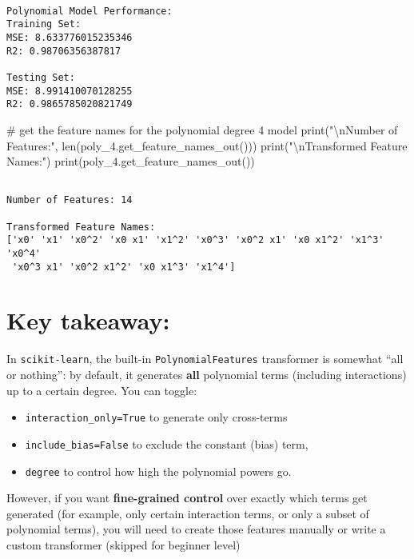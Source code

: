 \documentclass[
  letterpaper,
  DIV=11,
  numbers=noendperiod]{scrreprt}
\newenvironment{Shaded}{\begin{snugshade}}{\end{snugshade}}
\newcommand{\BuiltInTok}[1]{\textcolor[rgb]{0.00,0.23,0.31}{#1}}
\newcommand{\CharTok}[1]{\textcolor[rgb]{0.13,0.47,0.30}{#1}}
\newcommand{\CommentTok}[1]{\textcolor[rgb]{0.37,0.37,0.37}{#1}}
\newcommand{\NormalTok}[1]{\textcolor[rgb]{0.00,0.23,0.31}{#1}}
\newcommand{\StringTok}[1]{\textcolor[rgb]{0.13,0.47,0.30}{#1}}
\providecommand{\tightlist}{%
  \setlength{\itemsep}{0pt}\setlength{\parskip}{0pt}}\usepackage{longtable,booktabs,array}
\begin{document}
\begin{verbatim}

Polynomial Model Performance:
Training Set:
MSE: 8.633776015235346
R2: 0.98706356387817

Testing Set:
MSE: 8.991410070128255
R2: 0.9865785020821749
\end{verbatim}

\begin{Shaded}
\begin{Highlighting}[]
\CommentTok{\# get the feature names for the polynomial degree 4 model}
\BuiltInTok{print}\NormalTok{(}\StringTok{"}\CharTok{\textbackslash{}n}\StringTok{Number of Features:"}\NormalTok{, }\BuiltInTok{len}\NormalTok{(poly\_4.get\_feature\_names\_out()))}
\BuiltInTok{print}\NormalTok{(}\StringTok{"}\CharTok{\textbackslash{}n}\StringTok{Transformed Feature Names:"}\NormalTok{)}
\BuiltInTok{print}\NormalTok{(poly\_4.get\_feature\_names\_out())}
\end{Highlighting}
\end{Shaded}

\begin{verbatim}

Number of Features: 14

Transformed Feature Names:
['x0' 'x1' 'x0^2' 'x0 x1' 'x1^2' 'x0^3' 'x0^2 x1' 'x0 x1^2' 'x1^3' 'x0^4'
 'x0^3 x1' 'x0^2 x1^2' 'x0 x1^3' 'x1^4']
\end{verbatim}

\section{Key takeaway:}\label{key-takeaway}

In \texttt{scikit-learn}, the built-in \texttt{PolynomialFeatures}
transformer is somewhat ``all or nothing'': by default, it generates
\textbf{all} polynomial terms (including interactions) up to a certain
degree. You can toggle:

\begin{itemize}
\tightlist
\item
  \texttt{interaction\_only=True} to generate only cross-terms
\item
  \texttt{include\_bias=False} to exclude the constant (bias) term,
\item
  \texttt{degree} to control how high the polynomial powers go.
\end{itemize}

However, if you want \textbf{fine-grained control} over exactly which
terms get generated (for example, only certain interaction terms, or
only a subset of polynomial terms), you will need to create those
features manually or write a custom transformer (skipped for beginner
level)
\end{document}

